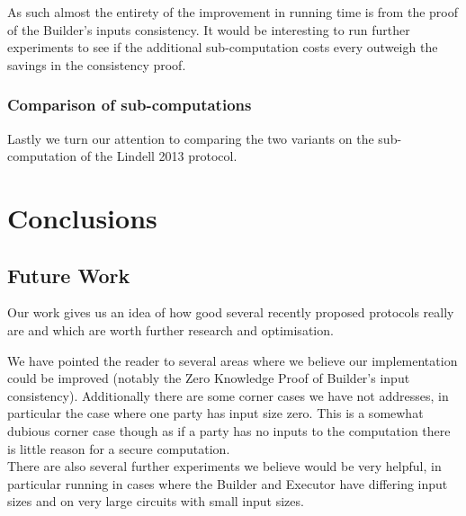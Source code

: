 \documentclass[ %
                    author={Nicholas Tutte},
                supervisor={Prof. Nigel Smart},
                    degree={MEng},
                     title={Secure Two Party Computation},
                  subtitle={A practical comparison of recent protocols},
                      type={Research - GG1K},
                      year={2015} ]{dissertation}
\begin{document}
					As such almost the entirety of the improvement in running time is from the proof of the Builder's inputs consistency. It would be interesting to run further experiments to see if the additional sub-computation costs every outweigh the savings in the consistency proof.

				\subsection{Comparison of sub-computations}
					Lastly we turn our attention to comparing the two variants on the sub-computation of the Lindell 2013 protocol. 


	\chapter{Conclusions}

		\section{Future Work}
			Our work gives us an idea of how good several recently proposed protocols really are and which are worth further research and optimisation.

			We have pointed the reader to several areas where we believe our implementation could be improved (notably the Zero Knowledge Proof of Builder's input consistency). Additionally there are some corner cases we have not addresses, in particular the case where one party has input size zero. This is a somewhat dubious corner case though as if a party has no inputs to the computation there is little reason for a secure computation.\\

			

			There are also several further experiments we believe would be very helpful, in particular running in cases where the Builder and Executor have differing input sizes and on very large circuits with small input sizes. 
\end{document}

